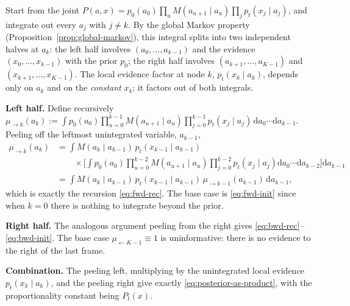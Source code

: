 \documentclass[11pt]{article}
\theoremstyle{definition}
\begin{document}
\begin{derivation}
Start from the joint
\(P(a, x) = p_0(a_0) \prod_u M(a_{u+1} \mid a_u) \prod_j p_t(x_j \mid
a_j)\), and integrate out every \(a_j\) with \(j \neq k\). By the
global Markov property (Proposition~\ref{prop:global-markov}), this
integral splits into two independent halves at \(a_k\): the left half
involves \((a_0, \dots, a_{k - 1})\) and the evidence
\((x_0, \dots, x_{k - 1})\) with the prior \(p_0\); the right half
involves \((a_{k + 1}, \dots, a_{K - 1})\) and
\((x_{k + 1}, \dots, x_{K - 1})\). The local evidence factor at node
\(k\), \(p_t(x_k \mid a_k)\), depends only on \(a_k\) and on the
\emph{constant} \(x_k\); it factors out of both integrals.

\textbf{Left half.} Define recursively
\(\mu_{\to k}(a_k) := \int p_0(a_0) \prod_{u = 0}^{k - 1}
M(a_{u + 1} \mid a_u) \prod_{j = 0}^{k - 1} p_t(x_j \mid a_j)\,
\mathrm da_0 \cdots \mathrm da_{k - 1}\). Peeling off the leftmost
unintegrated variable, \(a_{k - 1}\),
\begin{align}
    \mu_{\to k}(a_k)
        &= \int M(a_k \mid a_{k - 1})\, p_t(x_{k - 1} \mid a_{k - 1})
                \nonumber \\
        &\qquad \times \biggl[
                \int p_0(a_0) \prod_{u = 0}^{k - 2}
                    M(a_{u + 1} \mid a_u) \prod_{j = 0}^{k - 2}
                    p_t(x_j \mid a_j)
                    \mathrm da_0 \cdots \mathrm da_{k - 2}
                \biggr] \mathrm da_{k - 1} \nonumber \\
        &= \int M(a_k \mid a_{k - 1})\, p_t(x_{k - 1} \mid a_{k - 1})\,
                \mu_{\to k - 1}(a_{k - 1})\, \mathrm da_{k - 1},
\end{align}
which is exactly the recursion \eqref{eq:fwd-rec}. The base case is
\eqref{eq:fwd-init} since when \(k = 0\) there is nothing to integrate
beyond the prior.

\textbf{Right half.} The analogous argument peeling from the right
gives \eqref{eq:bwd-rec}--\eqref{eq:bwd-init}. The base case
\(\mu_{\leftarrow K - 1} \equiv 1\) is uninformative: there is no
evidence to the right of the last frame.

\textbf{Combination.} The peeling left, multiplying by the unintegrated
local evidence \(p_t(x_k \mid a_k)\), and the peeling right give
exactly \eqref{eq:posterior-as-product}, with the proportionality
constant being \(P_t(x)\).
\end{derivation}
\end{document}
